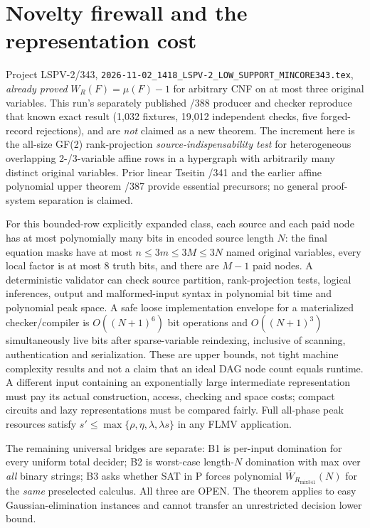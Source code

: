 \documentclass[11pt]{article}
\begin{document}
\section*{Novelty firewall and the representation cost}
Project LSPV-2/343, \texttt{2026-11-02\_1418\_LSPV-2\_LOW\_SUPPORT\_MINCORE343.tex}, \emph{already proved} $W_R(F)=\mu(F)-1$ for arbitrary CNF on at most three original variables. This run's separately published /388 producer and checker reproduce that known exact result (1,032 fixtures, 19,012 independent checks, five forged-record rejections), and are \emph{not} claimed as a new theorem. The increment here is the all-size GF(2) rank-projection \emph{source-indispensability test} for heterogeneous overlapping 2-/3-variable affine rows in a hypergraph with arbitrarily many distinct original variables. Prior linear Tseitin /341 and the earlier affine polynomial upper theorem /387 provide essential precursors; no general proof-system separation is claimed.

For this bounded-row explicitly expanded class, each source and each paid node has at most polynomially many bits in encoded source length $N$: the final equation masks have at most $n\le3m\le3M\le3N$ named original variables, every local factor is at most 8 truth bits, and there are $M-1$ paid nodes. A deterministic validator can check source partition, rank-projection tests, logical inferences, output and malformed-input syntax in polynomial bit time and polynomial peak space. A safe loose implementation envelope for a materialized checker/compiler is $O((N+1)^6)$ bit operations and $O((N+1)^3)$ simultaneously live bits after sparse-variable reindexing, inclusive of scanning, authentication and serialization. These are upper bounds, not tight machine complexity results and not a claim that an ideal DAG node count equals runtime. A different input containing an exponentially large intermediate representation must pay its actual construction, access, checking and space costs; compact circuits and lazy representations must be compared fairly. Full all-phase peak resources satisfy $s'\le\max\{\rho,\eta,\lambda,\lambda s\}$ in any FLMV application.

The remaining universal bridges are separate: B1 is per-input domination for every uniform total decider; B2 is worst-case length-$N$ domination with max over \emph{all} binary strings; B3 asks whether SAT in P forces polynomial $\overline W_{R_{\mathrm{mix341}}}(N)$ for the \emph{same} preselected calculus. All three are OPEN. The theorem applies to easy Gaussian-elimination instances and cannot transfer an unrestricted decision lower bound.
\end{document}
